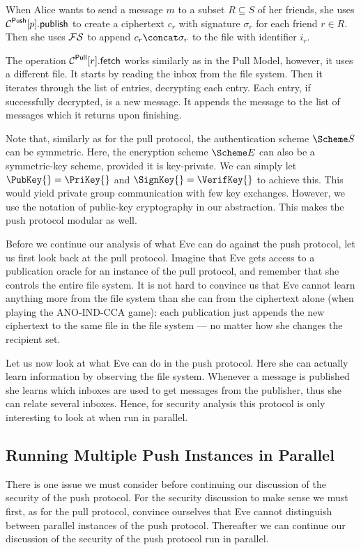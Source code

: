 When Alice wants to send a message \(m\) to a subset \(R\subseteq S\) of her 
friends, she uses \(\pnpub{p}\) to create a ciphertext \(c_r\) with signature 
\(\sigma_r\) for each friend \(r\in R\).
Then she uses \(\FS\) to append \(c_r\concat \sigma_r\) to the file with 
identifier \(i_r\).

The operation \(\pget{r}\) works similarly as in the Pull Model, however, it 
uses a different file.
It starts by reading the inbox from the file system.
Then it iterates through the list of entries, decrypting each entry.
Each entry, if successfully decrypted, is a new message.
It appends the message to the list of messages which it returns upon 
finishing.

Note that, similarly as for the pull protocol, the authentication scheme \(\S\) 
can be symmetric.
Here, the encryption scheme \(\E\) can also be a symmetric-key scheme, provided 
it is key-private.
We can simply let \(\PubKey{} = \PriKey{}\) and \(\SignKey{} = \VerifKey{}\) to 
achieve this.
This would yield private group communication with few key exchanges.
However, we use the notation of public-key cryptography in our abstraction.
This makes the push protocol modular as well.

Before we continue our analysis of what Eve can do against the push protocol, 
let us first look back at the pull protocol.
Imagine that Eve gets access to a publication oracle for an instance of the 
pull protocol, and remember that she controls the entire file system.
It is not hard to convince us that Eve cannot learn anything more from the file
system than she can from the ciphertext alone (when playing the ANO-IND-CCA 
game): each publication just appends the new ciphertext to the same file in the
file system --- no matter how she changes the recipient set.

Let us now look at what Eve can do in the push protocol.
Here she can actually learn information by observing the file system.
Whenever a message is published she learns which inboxes are used to get 
messages from the publisher, thus she can relate several inboxes.
Hence, for security analysis this protocol is only interesting to look at when 
run in parallel.

\subsection{Running Multiple Push Instances in Parallel}
\label{ParallelPush}

There is one issue we must consider before continuing our discussion of the 
security of the push protocol.
For the security discussion to make sense we must first, as for the pull 
protocol, convince ourselves that Eve cannot distinguish between parallel 
instances of the push protocol.
Thereafter we can continue our discussion of the security of the push protocol 
run in parallel.

